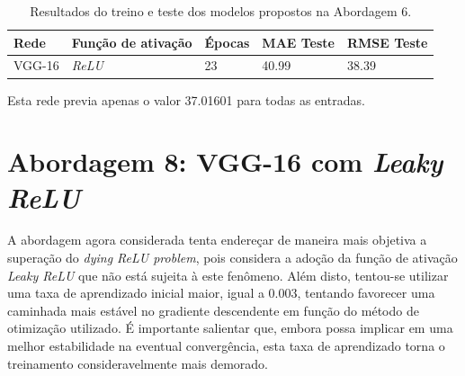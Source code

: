 \begin{table}[!ht]
	\centering
	\caption{Resultados do treino e teste dos modelos propostos na Abordagem 6.}
	\label{tab:results-7}
		\begin{tabular}{l l l l l }
			\toprule
			Rede & Função de ativação & Épocas & MAE Teste & RMSE Teste \\
			\midrule
			VGG-16 & \emph{ReLU} & 23 & 40.99 & 38.39 \\
			\bottomrule
		\end{tabular}
	\end{table}


Esta rede previa apenas o valor 37.01601 para todas as entradas.
\section{Abordagem 8: VGG-16 com \emph{Leaky ReLU}}

 A abordagem agora considerada tenta endereçar de maneira mais objetiva a superação do \emph{dying ReLU problem}, pois considera a adoção da função de ativação \emph{Leaky ReLU} que não está sujeita à este fenômeno. Além disto, tentou-se utilizar uma taxa de aprendizado inicial maior, igual a $0.003$, tentando favorecer uma caminhada mais estável no gradiente descendente em função do método de otimização utilizado.  É importante salientar que, embora possa implicar em uma melhor estabilidade na eventual convergência, esta taxa de aprendizado torna o treinamento consideravelmente mais demorado.

